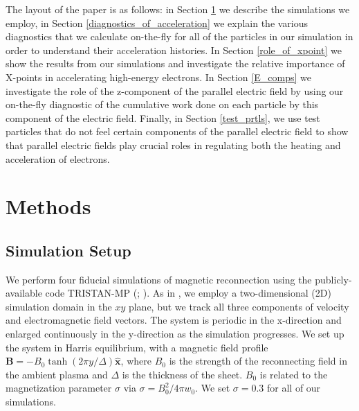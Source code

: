 The layout of the paper is as follows: in Section \ref{methods} we describe the simulations we employ, in Section \ref{diagnostics_of_acceleration} we explain the various diagnostics that we calculate on-the-fly for all of the particles in our simulation in order to understand their acceleration histories.  In Section \ref{role_of_xpoint} we show the results from our simulations and investigate the relative importance of X-points in accelerating high-energy electrons.  In Section \ref{E_comps} we investigate the role of the z-component of the parallel electric field by using our on-the-fly diagnostic of the cumulative work done on each particle by this component of the electric field.  Finally, in Section \ref{test_prtls}, we use test particles that do not feel certain components of the parallel electric field to show that parallel electric fields play crucial roles in regulating both the heating and acceleration of electrons. 

\section{Methods} \label{methods}

\subsection{Simulation Setup} \label{sim_details}
We perform four fiducial simulations of magnetic reconnection using the publicly-available code TRISTAN-MP (\citealt{buneman93}; \citealt{spitkovsky05}).  As in \citet{ball2018}, we employ a two-dimensional (2D) simulation domain in the $xy$ plane, but we track all three components of velocity and electromagnetic field vectors.  The system is periodic in the x-direction and enlarged continuously in the y-direction as the simulation progresses.  We set up the system in Harris equilibrium, with a magnetic field profile $\bm{{B}} = -B_{0}\tanh{\left(2\pi y / \Delta\right)}\bm{\hat{x}}$, where $B_{0}$ is the strength of the reconnecting field in the ambient plasma and $\Delta$ is the thickness of the sheet.  $B_{0}$ is related to the magnetization parameter $\sigma$ via $\sigma=B_{0}^2 / 4\pi w_{0} $.  We set $\sigma=0.3$ for all of our simulations.


